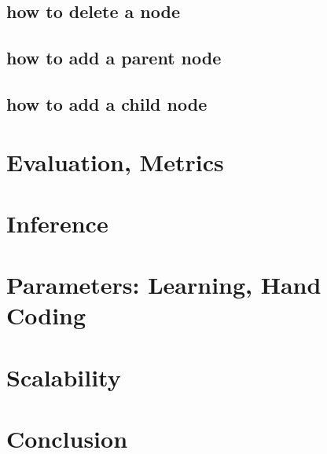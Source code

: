 \documentclass{article}
\begin{document}
\subsection{how to delete a node}
\subsection{how to add a parent node}
\subsection{how to add a child node}

\section{Evaluation, Metrics}

\section{Inference}

\section{Parameters: Learning, Hand Coding}

\section{Scalability}

\section{Conclusion}
\end{document}
